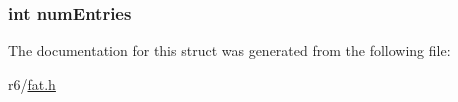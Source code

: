 \subsubsection[{\texorpdfstring{num\+Entries}{numEntries}}]{\setlength{\rightskip}{0pt plus 5cm}int num\+Entries}\hypertarget{structfat__tables_a75b15f0e26b4ccf3195772b134b660ec}{}\label{structfat__tables_a75b15f0e26b4ccf3195772b134b660ec}


The documentation for this struct was generated from the following file\+:\begin{DoxyCompactItemize}
\item 
r6/\hyperlink{fat_8h}{fat.\+h}\end{DoxyCompactItemize}
